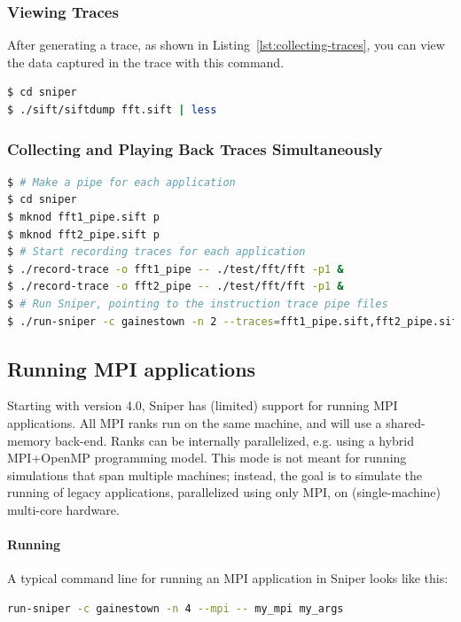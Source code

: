 \documentclass[a4paper,11pt,titlepage]{article}
\begin{document}
\subsubsection{Viewing Traces}

After generating a trace, as shown in Listing~\ref{lst:collecting-traces}, you can view the data captured in the trace
with this command.

\begin{lstlisting}[label=lst:viewing-traces,caption=Viewing Traces,rulecolor=\color{DarkSlateBlue},language=Bash]
$ cd sniper
$ ./sift/siftdump fft.sift | less
\end{lstlisting}

\subsubsection{Collecting and Playing Back Traces Simultaneously}

\begin{lstlisting}[label=lst:collect-and-playback-traces,caption=Simultaneous Recording/Playback of Traces,rulecolor=\color{DarkSlateBlue},language=Bash,deletekeywords=test]
$ # Make a pipe for each application
$ cd sniper
$ mknod fft1_pipe.sift p
$ mknod fft2_pipe.sift p
$ # Start recording traces for each application
$ ./record-trace -o fft1_pipe -- ./test/fft/fft -p1 &
$ ./record-trace -o fft2_pipe -- ./test/fft/fft -p1 &
$ # Run Sniper, pointing to the instruction trace pipe files
$ ./run-sniper -c gainestown -n 2 --traces=fft1_pipe.sift,fft2_pipe.sift
\end{lstlisting}


\subsection{Running MPI applications}

Starting with version 4.0, Sniper has (limited) support for running MPI applications.
All MPI ranks run on the same machine, and will use a shared-memory back-end.
Ranks can be internally parallelized, e.g. using a hybrid MPI+OpenMP programming model.
This mode is not meant for running simulations that span multiple machines; instead,
the goal is to simulate the running of legacy applications, parallelized using only MPI,
on (single-machine) multi-core hardware.

\paragraph{Running}
A typical command line for running an MPI application in Sniper looks like this:
\begin{lstlisting}[label=lst:running-mpi-apps,caption=Running MPI applications in Sniper,rulecolor=\color{DarkSlateBlue},language=Bash,deletekeywords=test]
run-sniper -c gainestown -n 4 --mpi -- my_mpi my_args
\end{lstlisting}
\end{document}
